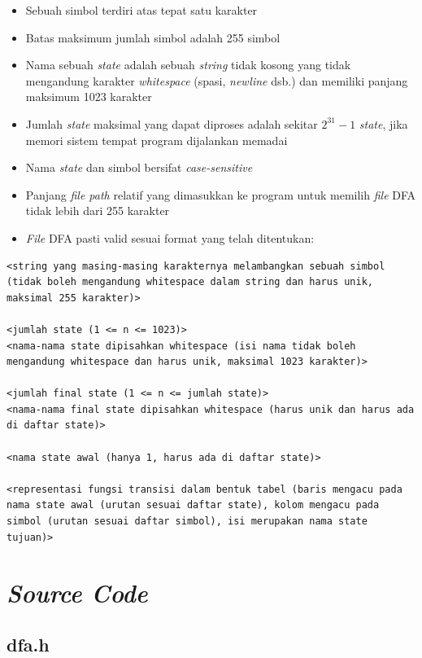 \documentclass[a4paper,titlepage]{article}
\begin{document}
		\begin{itemize}
			\item Sebuah simbol terdiri atas tepat satu karakter
			\item Batas maksimum jumlah simbol adalah 255 simbol
			\item Nama sebuah \textit{state} adalah sebuah \textit{string} tidak kosong yang tidak mengandung karakter \textit{whitespace} (spasi, \textit{newline} dsb.) dan memiliki panjang maksimum 1023 karakter
			\item Jumlah \textit{state} maksimal yang dapat diproses adalah sekitar $2^{31}-1$ \textit{state}, jika memori sistem tempat program dijalankan memadai
			\item Nama \textit{state} dan simbol bersifat \textit{case-sensitive}
			\item Panjang \textit{file path} relatif yang dimasukkan ke program untuk memilih \textit{file} DFA tidak lebih dari 255 karakter
			\item \textit{File} DFA pasti valid sesuai format yang telah ditentukan:
		\end{itemize}

		\begin{lstlisting}
<string yang masing-masing karakternya melambangkan sebuah simbol (tidak boleh mengandung whitespace dalam string dan harus unik, maksimal 255 karakter)>

<jumlah state (1 <= n <= 1023)>
<nama-nama state dipisahkan whitespace (isi nama tidak boleh mengandung whitespace dan harus unik, maksimal 1023 karakter)>

<jumlah final state (1 <= n <= jumlah state)>
<nama-nama final state dipisahkan whitespace (harus unik dan harus ada di daftar state)>

<nama state awal (hanya 1, harus ada di daftar state)>

<representasi fungsi transisi dalam bentuk tabel (baris mengacu pada nama state awal (urutan sesuai daftar state), kolom mengacu pada simbol (urutan sesuai daftar simbol), isi merupakan nama state tujuan)>
		\end{lstlisting}

	\section{\textit{Source Code}}

		\subsection{dfa.h}
			
\end{document}
